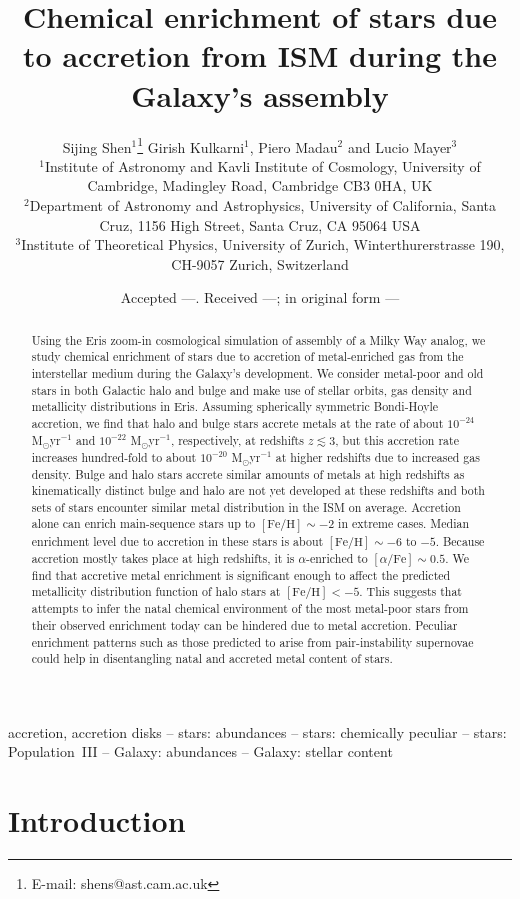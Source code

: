 \documentclass[a4paper,fleqn,usenatbib]{mnras}
\title[Accretion by stars]{Chemical enrichment of stars due to accretion from ISM during the Galaxy's assembly}
\author[Shen et al.]
       {Sijing Shen$^{1}$\thanks{E-mail: shens@ast.cam.ac.uk}
         Girish Kulkarni$^{1}$,
         Piero Madau$^{2}$
         and Lucio Mayer$^{3}$ \\
         $^{1}$Institute of Astronomy and Kavli
         Institute of Cosmology, University of Cambridge, Madingley Road,
         Cambridge CB3 0HA, UK \\
         $^{2}$Department of Astronomy and Astrophysics, University
         of California, Santa Cruz, 1156 High Street, Santa Cruz, CA
         95064 USA \\
         $^{3}$Institute of Theoretical Physics, University of
         Zurich, Winterthurerstrasse 190, CH-9057 Zurich, Switzerland}
\date{Accepted ---. Received ---; in original form ---}
\begin{document}
\label{firstpage}
\pagerange{\pageref{firstpage}--\pageref{lastpage}}
\maketitle

\begin{abstract}
Using the Eris zoom-in cosmological simulation of assembly of a Milky
Way analog, we study chemical enrichment of stars due to accretion of
metal-enriched gas from the interstellar medium during the Galaxy's
development.  We consider metal-poor and old stars in both Galactic
halo and bulge and make use of stellar orbits, gas density and
metallicity distributions in Eris.  Assuming spherically symmetric
Bondi-Hoyle accretion, we find that halo and bulge stars accrete
metals at the rate of about $10^{-24}$ M$_\odot$yr$^{-1}$ and
$10^{-22}$ M$_\odot$yr$^{-1}$, respectively, at redshifts $z\lesssim
3$, but this accretion rate increases hundred-fold to about $10^{-20}$
M$_\odot$yr$^{-1}$ at higher redshifts due to increased gas density.
Bulge and halo stars accrete similar amounts of metals at high
redshifts as kinematically distinct bulge and halo are not yet
developed at these redshifts and both sets of stars encounter similar
metal distribution in the ISM on average.  Accretion alone can enrich
main-sequence stars up to $[\mathrm{Fe}/\mathrm{H}]\sim -2$ in extreme
cases.  Median enrichment level due to accretion in these stars is
about $[\mathrm{Fe}/\mathrm{H}] \sim -6$ to $-5$.  Because accretion
mostly takes place at high redshifts, it is $\alpha$-enriched to
$[\alpha/\mathrm{Fe}]\sim 0.5$.  We find that accretive metal
enrichment is significant enough to affect the predicted metallicity
distribution function of halo stars at $[\mathrm{Fe}/\mathrm{H}]<-5$.
This suggests that attempts to infer the natal chemical environment of
the most metal-poor stars from their observed enrichment today can be
hindered due to metal accretion.  Peculiar enrichment patterns such as
those predicted to arise from pair-instability supernovae could help
in disentangling natal and accreted metal content of stars.
\end{abstract}

\begin{keywords}
accretion, accretion disks -- stars: abundances -- stars: chemically
peculiar -- stars: Population~III -- Galaxy: abundances -- Galaxy:
stellar content
\end{keywords}

\section{Introduction}
\end{document}

